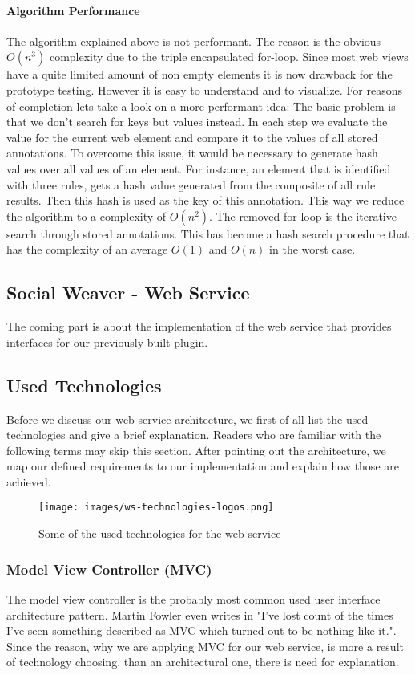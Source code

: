 \paragraph{Algorithm Performance}
The algorithm explained above is not performant. The reason is the obvious $O(n^3)$ complexity due to the triple encapsulated for-loop. Since most web views have a quite limited amount of non empty elements it is now drawback for the prototype testing. However it is easy to understand and to visualize. 
For reasons of completion lets take a look on a more performant idea:
The basic problem is that we don't search for keys but values instead. In each step we evaluate the value for the current web element and compare it to the values of all stored annotations. To overcome this issue, it would be necessary to generate hash values over all values of an element. 
For instance, an element that is identified with three rules,  gets a hash value generated from the  composite of all rule results. Then this hash is used as the key of this annotation. 
This way we reduce the algorithm to a complexity of $O(n^2)$. The removed for-loop is the iterative search through stored annotations. This has become a hash search procedure that has the complexity of an average $O(1)$ and $O(n)$ in the worst case.

\newpage
\subsection{Social Weaver - Web Service}
The coming part is about the implementation of the web service that provides interfaces for our previously built plugin.

\subsection{Used Technologies}
Before we discuss our web service architecture, we first of all list the used technologies and give a brief explanation. Readers who are familiar with the following terms may skip this section. 
After pointing out the architecture, we map our defined requirements to our implementation and explain how those are achieved.

\begin{figure}\centering
		\texttt{[image: images/ws-technologies-logos.png]}
		\caption{Some of the used technologies for the web service}
		\label{ws-technologies-logos}
\end{figure} 

\subsubsection*{Model View Controller (MVC)}
The model view controller is the probably most common used user interface architecture pattern. Martin Fowler even writes in \cite{fowler2006gui} "I've lost count of the times I've seen something described as MVC which turned out to be nothing like it.". Since the reason, why we are applying MVC for our web service, is more a result of technology choosing, than an architectural one, there is need for explanation.

